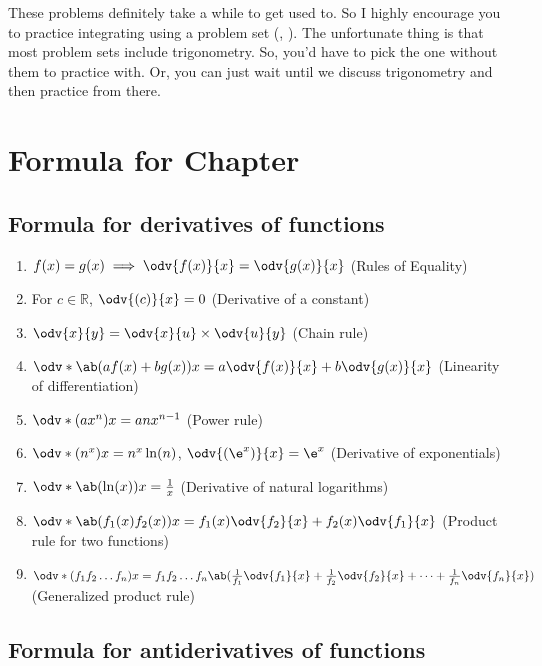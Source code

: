 These problems definitely take a while to get used to. So I highly encourage you to practice integrating using a problem set (\cite{alkousa-2023}, \cite{foster-no-date}). The unfortunate thing is that most problem sets include trigonometry. So, you'd have to pick the one without them to practice with. Or, you can just wait until we discuss trigonometry and then practice from there.

\section{Formula for Chapter \thechapter}

\everymath{\displaystyle}
\subsection{Formula for derivatives of functions}

\begin{enumerate}
	\item $f(x) = g(x) \implies \odv{f(x)}{x} = \odv{g(x)}{x}$ (Rules of Equality)
	\item For $c \in \mathbb{R}$, $\odv{(c)}{x} = 0$ (Derivative of a constant)
	\item $\odv{x}{y} = \odv{x}{u} \times \odv{u}{y}$ (Chain rule)
	\item $\odv*{\ab(af(x) + bg(x))}{x} = a\odv{f(x)}{x} + b\odv{g(x)}{x}$ (Linearity of differentiation)
	\item $\odv*{(ax^n)}{x} = anx^{n - 1}$ (Power rule)
	\item $\odv*{(n^x)}{x} = n^x\ln(n)$, $\odv{(\e^x)}{x} = \e^x$ (Derivative of exponentials)
	\item $\odv*{\ab(\ln(x))}{x} = \frac{1}{x}$ (Derivative of natural logarithms)
	\item $\odv*{\ab(f_1(x)f_2(x))}{x} = f_1(x)\odv{f_2}{x} + f_2(x)\odv{f_1}{x}$ (Product rule for two functions)
	\item $\odv*{(f_1f_2\dots f_n)}{x} = f_1f_2\dots f_n\ab(\frac{1}{f_1}\odv{f_1}{x} + \frac{1}{f_2}\odv{f_2}{x} + \dots + \frac{1}{f_n}\odv{f_n}{x})$ (Generalized product rule)
\end{enumerate}

\subsection{Formula for antiderivatives of functions}

